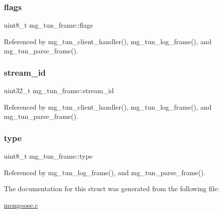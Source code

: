 \subsubsection{\texorpdfstring{flags}{flags}}
{\footnotesize\ttfamily uint8\+\_\+t mg\+\_\+tun\+\_\+frame\+::flags}



Referenced by mg\+\_\+tun\+\_\+client\+\_\+handler(), mg\+\_\+tun\+\_\+log\+\_\+frame(), and mg\+\_\+tun\+\_\+parse\+\_\+frame().

\mbox{\label{structmg__tun__frame_a01db02c8e303dd90887b38efb8444b2b_a01db02c8e303dd90887b38efb8444b2b}} 
\subsubsection{\texorpdfstring{stream\+\_\+id}{stream\_id}}
{\footnotesize\ttfamily uint32\+\_\+t mg\+\_\+tun\+\_\+frame\+::stream\+\_\+id}



Referenced by mg\+\_\+tun\+\_\+client\+\_\+handler(), mg\+\_\+tun\+\_\+log\+\_\+frame(), and mg\+\_\+tun\+\_\+parse\+\_\+frame().

\mbox{\label{structmg__tun__frame_a7b0c01ce546ee5b25b7910958e0acde1_a7b0c01ce546ee5b25b7910958e0acde1}} 
\subsubsection{\texorpdfstring{type}{type}}
{\footnotesize\ttfamily uint8\+\_\+t mg\+\_\+tun\+\_\+frame\+::type}



Referenced by mg\+\_\+tun\+\_\+log\+\_\+frame(), and mg\+\_\+tun\+\_\+parse\+\_\+frame().



The documentation for this struct was generated from the following file\+:\begin{DoxyCompactItemize}
\item 
\hyperlink{mongoose_8c}{mongoose.\+c}\end{DoxyCompactItemize}
